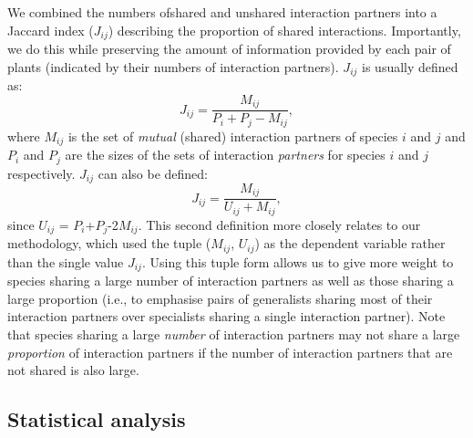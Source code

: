 \documentclass[12pt]{article}
\begin{document}
\begin{spacing}{1.5}
    We combined the numbers ofshared and unshared interaction partners
    into a Jaccard index ($J_{ij}$) describing 
    the proportion of shared interactions. Importantly, we do this while 
    preserving the amount of information provided by each pair of plants
    (indicated by their numbers of interaction partners). $J_{ij}$ is usually defined as: 
    \begin{equation}
      J_{ij} = \frac{M_{ij}}{P_i+P_j-M_{ij}} ,
    \end{equation}
    where $M_{ij}$ is the set of \emph{mutual} (shared) interaction partners of 
    species $i$ and $j$ and $P_i$ and $P_j$ are the sizes of the sets of interaction 
    \emph{partners} for species $i$ and $j$ respectively. $J_{ij}$ can also be defined:
    \begin{equation}
      J_{ij} = \frac{M_{ij}}{U_{ij}+M_{ij}} ,
    \end{equation}
    since $U_{ij}$ = $P_{i}$+$P_{j}$-2$M_{ij}$. This second definition more closely
    relates to our methodology, which used the tuple ($M_{ij}$, $U_{ij}$) as the
    dependent variable rather than the single value $J_{ij}$. Using this tuple form
    allows us to give more 
    weight to species sharing a large number of interaction partners as well as 
    those sharing a large proportion (i.e., to emphasise pairs of generalists 
    sharing most of their interaction partners over specialists sharing a single 
    interaction partner). Note that species sharing a large \emph{number} of interaction partners may not share a large \emph{proportion} of interaction partners if the number of interaction partners that are not shared is also large. %


  \subsection*{Statistical analysis} 


\end{spacing}
\end{document}

